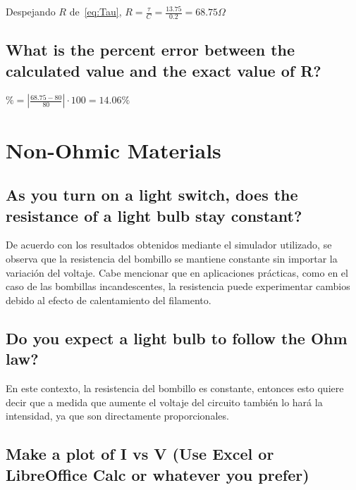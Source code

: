 \documentclass[twocolumn, 12pt]{article}
\begin{document}
Despejando $R$ de~\eqref{eq:Tau}, $R = \frac{\tau}{C} =
    \frac{13.75}{0.2} = 68.75 \Omega$

\subsection{What is the percent error between the calculated value and the exact value of R?}

$\% = \left\lvert \frac{68.75 - 80}{80} \right\rvert  \cdot 100 = 14.06\%$

\section{Non-Ohmic Materials}

\subsection{As you turn on a light switch, does the resistance of a light bulb stay constant?}

De acuerdo con los resultados obtenidos mediante el
simulador utilizado, se observa que la resistencia del
bombillo se mantiene constante sin importar la variación
del voltaje. Cabe mencionar que en aplicaciones prácticas,
como en el caso de las bombillas incandescentes, la
resistencia puede experimentar cambios debido al efecto de
calentamiento del filamento.

\subsection{Do you expect a light bulb to follow the Ohm law?}

\nocite{prezi.com}

En este contexto, la resistencia del bombillo es constante,
entonces esto quiere decir que a medida que aumente el
voltaje del circuito también lo hará la intensidad, ya que
son directamente proporcionales.

\subsection*{Make a plot of I vs V (Use Excel or LibreOffice Calc or whatever you prefer)}
\end{document}
